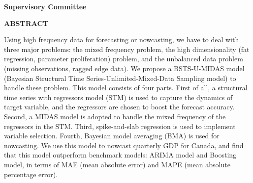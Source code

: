 \newpage
{}

\noindent \textbf{Supervisory Committee}
\tpbreak
\panel

\begin{center}
\textbf{ABSTRACT}
\end{center}


Using high frequency data for forecasting or nowcasting, we have to deal with three major problems: the mixed frequency problem,  the high dimensionality (fat regression, parameter proliferation) problem, and the unbalanced data problem (missing observations, ragged edge data). We propose a BSTS-U-MIDAS model (Bayesian Structural Time Series-Unlimited-Mixed-Data Sampling model) to handle these problem. This model consists of four parts. First of all, a structural  time series with regressors model (STM) is used to capture the dynamics of target variable, and the regressors are chosen to boost the forecast accuracy.  Second, a MIDAS model is adopted to handle the mixed frequency of the regressors in  the STM. Third,  spike-and-slab regression is used to implement variable selection. Fourth, Bayesian model averaging (BMA) is used for nowcasting.  We use this model to nowcast quarterly GDP for Canada, and find that this model outperform  benchmark models: ARIMA model and Boosting model, in terms of MAE (mean absolute error) and MAPE (mean absolute percentage error).
